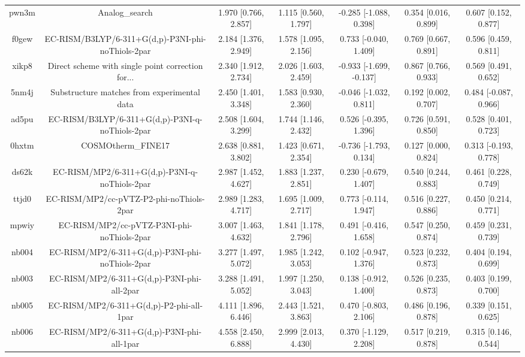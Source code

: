 \documentclass{article}
\begin{document}
\begin{center}
\begin{longtable}{|ccccccc|}
 pwn3m &                                     Analog\_search &  1.970 [0.766, 2.857] &  1.115 [0.560, 1.797] &   -0.285 [-1.088, 0.398] &  0.354 [0.016, 0.899] &   0.607 [0.152, 0.877] \\
 f0gew &  EC-RISM/B3LYP/6-311+G(d,p)-P3NI-phi-noThiols-2par &  2.184 [1.376, 2.949] &  1.578 [1.095, 2.156] &    0.733 [-0.040, 1.409] &  0.769 [0.667, 0.891] &   0.596 [0.459, 0.811] \\
 xikp8 &  Direct scheme with single point correction for... &  2.340 [1.912, 2.734] &  2.026 [1.603, 2.459] &  -0.933 [-1.699, -0.137] &  0.867 [0.766, 0.933] &   0.569 [0.491, 0.652] \\
 5nm4j &        Substructure matches from experimental data &  2.450 [1.401, 3.348] &  1.583 [0.930, 2.360] &   -0.046 [-1.032, 0.811] &  0.192 [0.002, 0.707] &  0.484 [-0.087, 0.966] \\
 ad5pu &    EC-RISM/B3LYP/6-311+G(d,p)-P3NI-q-noThiols-2par &  2.508 [1.604, 3.299] &  1.744 [1.146, 2.432] &    0.526 [-0.395, 1.396] &  0.726 [0.591, 0.850] &   0.528 [0.401, 0.723] \\
 0hxtm &                                 COSMOtherm\_FINE17 &  2.638 [0.881, 3.802] &  1.423 [0.671, 2.354] &   -0.736 [-1.793, 0.134] &  0.127 [0.000, 0.824] &  0.313 [-0.193, 0.778] \\
 ds62k &      EC-RISM/MP2/6-311+G(d,p)-P3NI-q-noThiols-2par &  2.987 [1.452, 4.627] &  1.883 [1.237, 2.851] &    0.230 [-0.679, 1.407] &  0.540 [0.244, 0.883] &   0.461 [0.228, 0.749] \\
 ttjd0 &           EC-RISM/MP2/cc-pVTZ-P2-phi-noThiols-2par &  2.989 [1.283, 4.717] &  1.695 [1.009, 2.717] &    0.773 [-0.114, 1.947] &  0.516 [0.227, 0.886] &   0.450 [0.214, 0.771] \\
 mpwiy &         EC-RISM/MP2/cc-pVTZ-P3NI-phi-noThiols-2par &  3.007 [1.463, 4.632] &  1.841 [1.178, 2.796] &    0.491 [-0.416, 1.658] &  0.547 [0.250, 0.874] &   0.459 [0.231, 0.739] \\
 nb004 &    EC-RISM/MP2/6-311+G(d,p)-P3NI-phi-noThiols-2par &  3.277 [1.497, 5.072] &  1.985 [1.242, 3.053] &    0.102 [-0.947, 1.376] &  0.523 [0.232, 0.873] &   0.404 [0.194, 0.699] \\
 nb003 &         EC-RISM/MP2/6-311+G(d,p)-P3NI-phi-all-2par &  3.288 [1.491, 5.052] &  1.997 [1.250, 3.043] &    0.138 [-0.912, 1.400] &  0.526 [0.235, 0.873] &   0.403 [0.199, 0.700] \\
 nb005 &           EC-RISM/MP2/6-311+G(d,p)-P2-phi-all-1par &  4.111 [1.896, 6.446] &  2.443 [1.521, 3.863] &    0.470 [-0.803, 2.106] &  0.486 [0.196, 0.878] &   0.339 [0.151, 0.625] \\
 nb006 &         EC-RISM/MP2/6-311+G(d,p)-P3NI-phi-all-1par &  4.558 [2.450, 6.888] &  2.999 [2.013, 4.430] &    0.370 [-1.129, 2.208] &  0.517 [0.219, 0.878] &   0.315 [0.146, 0.544] \\
\end{longtable}
\end{center}
\end{document}
